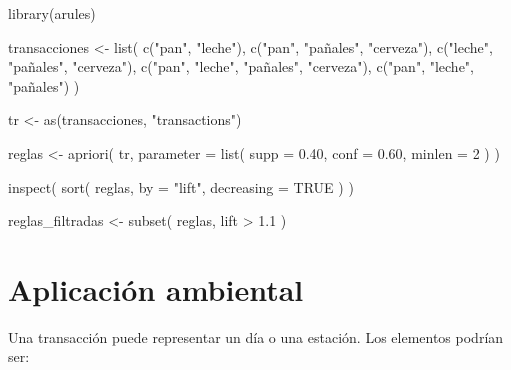 \documentclass[
  spanish,
  10.5pt,
  letterpaper,
  DIV=11,
  numbers=noendperiod,
  oneside,
  open=any]{scrreprt}
\newenvironment{Shaded}{\begin{snugshade}}{\end{snugshade}}
\newcommand{\AttributeTok}[1]{\textcolor[rgb]{0.40,0.45,0.13}{#1}}
\newcommand{\ConstantTok}[1]{\textcolor[rgb]{0.56,0.35,0.01}{#1}}
\newcommand{\DecValTok}[1]{\textcolor[rgb]{0.68,0.00,0.00}{#1}}
\newcommand{\FloatTok}[1]{\textcolor[rgb]{0.68,0.00,0.00}{#1}}
\newcommand{\FunctionTok}[1]{\textcolor[rgb]{0.28,0.35,0.67}{#1}}
\newcommand{\NormalTok}[1]{\textcolor[rgb]{0.00,0.23,0.31}{#1}}
\newcommand{\OtherTok}[1]{\textcolor[rgb]{0.00,0.23,0.31}{#1}}
\newcommand{\SpecialCharTok}[1]{\textcolor[rgb]{0.37,0.37,0.37}{#1}}
\newcommand{\StringTok}[1]{\textcolor[rgb]{0.13,0.47,0.30}{#1}}
\theoremstyle{definition}
\theoremstyle{definition}
\theoremstyle{plain}
\theoremstyle{remark}
\begin{document}
\begin{Shaded}
\begin{Highlighting}[numbers=left,,]
\FunctionTok{library}\NormalTok{(arules)}

\NormalTok{transacciones }\OtherTok{\textless{}{-}} \FunctionTok{list}\NormalTok{(}
  \FunctionTok{c}\NormalTok{(}\StringTok{"pan"}\NormalTok{, }\StringTok{"leche"}\NormalTok{),}
  \FunctionTok{c}\NormalTok{(}\StringTok{"pan"}\NormalTok{, }\StringTok{"pañales"}\NormalTok{, }\StringTok{"cerveza"}\NormalTok{),}
  \FunctionTok{c}\NormalTok{(}\StringTok{"leche"}\NormalTok{, }\StringTok{"pañales"}\NormalTok{, }\StringTok{"cerveza"}\NormalTok{),}
  \FunctionTok{c}\NormalTok{(}\StringTok{"pan"}\NormalTok{, }\StringTok{"leche"}\NormalTok{, }\StringTok{"pañales"}\NormalTok{, }\StringTok{"cerveza"}\NormalTok{),}
  \FunctionTok{c}\NormalTok{(}\StringTok{"pan"}\NormalTok{, }\StringTok{"leche"}\NormalTok{, }\StringTok{"pañales"}\NormalTok{)}
\NormalTok{)}

\NormalTok{tr }\OtherTok{\textless{}{-}} \FunctionTok{as}\NormalTok{(transacciones, }\StringTok{"transactions"}\NormalTok{)}

\NormalTok{reglas }\OtherTok{\textless{}{-}} \FunctionTok{apriori}\NormalTok{(}
\NormalTok{  tr,}
  \AttributeTok{parameter =} \FunctionTok{list}\NormalTok{(}
    \AttributeTok{supp =} \FloatTok{0.40}\NormalTok{,}
    \AttributeTok{conf =} \FloatTok{0.60}\NormalTok{,}
    \AttributeTok{minlen =} \DecValTok{2}
\NormalTok{  )}
\NormalTok{)}

\FunctionTok{inspect}\NormalTok{(}
  \FunctionTok{sort}\NormalTok{(}
\NormalTok{    reglas,}
    \AttributeTok{by =} \StringTok{"lift"}\NormalTok{,}
    \AttributeTok{decreasing =} \ConstantTok{TRUE}
\NormalTok{  )}
\NormalTok{)}

\NormalTok{reglas\_filtradas }\OtherTok{\textless{}{-}} \FunctionTok{subset}\NormalTok{(}
\NormalTok{  reglas,}
\NormalTok{  lift }\SpecialCharTok{\textgreater{}} \FloatTok{1.1}
\NormalTok{)}
\end{Highlighting}
\end{Shaded}

\section*{Aplicación ambiental}\label{aplicaciuxf3n-ambiental}


Una transacción puede representar un día o una estación. Los elementos
podrían ser:
\end{document}
